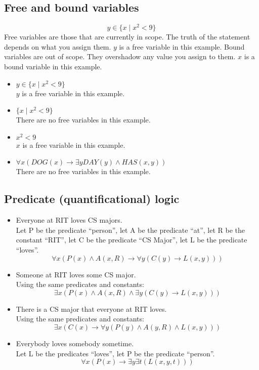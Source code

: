 \documentclass{math}
\begin{document}
\subsection*{Free and bound variables}
\[ y\in\{x\mid x^2<9\} \]
Free variables are those that are currently in scope. The truth of the statement
depends on what you assign them. \( y \) is a free variable in this example.
Bound variables are out of scope. They overshadow any value you assign to them.
\( x \) is a bound variable in this example.
\begin{itemize}
  \item \( y\in\{x\mid x^2<9\} \) \\
    \( y \) is a free variable in this example.
  \item \( \{x\mid x^2<9\} \) \\
    There are no free variables in this example.
  \item \( x^2<9 \) \\
    \( x \) is a free variable in this example.
  \item \( \forall{x}(DOG(x)\to\exists{y}DAY(y)\wedge HAS(x,y)) \) \\
    There are no free variables in this example.
\end{itemize}

\subsection*{Predicate (quantificational) logic}
\begin{itemize}
  \item Everyone at RIT loves CS majors. \\
    Let P be the predicate ``person'', let A be the predicate ``at'', let
    R be the constant ``RIT'', let C be the predicate ``CS Major'', let L
    be the predicate ``loves''.
    \[ \forall{x}(P(x)\wedge A(x,R)\to\forall{y}(C(y)\to L(x,y))) \]
  \item Someone at RIT loves some CS major. \\
    Using the same predicates and constants:
    \[ \exists{x}(P(x)\wedge A(x,R)\wedge\exists{y}(C(y)\to L(x,y))) \]
  \item There is a CS major that everyone at RIT loves. \\
    Using the same predicates and constants:
    \[ \exists{x}(C(x)\to\forall{y}(P(y)\wedge A(y,R)\wedge L(x,y))) \]
  \item Everybody loves somebody sometime. \\
    Let L be the predicates ``loves'', let P be the predicate ``person''.
    \[ \forall{x}(P(x)\to\exists{y}\exists{t}(L(x,y,t))) \]
\end{itemize}
\end{document}

